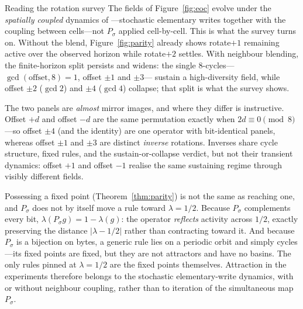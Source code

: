 \documentclass[man,12pt,floatsintext,donotrepeattitle]{apa7}
\newcommand{\sig}{\sigma}
\newcommand{\secref}[1]{\emph{\nameref{#1}}}
\begin{document}
\begin{workedexample}[label={box:survey},breakable=false]{Reading the rotation survey}
\small
The fields of Figure~\ref{fig:eoc} evolve under the \emph{spatially coupled}
dynamics of \secref{sec:interrupter}---stochastic elementary writes together
with the coupling between cells---not $P_\sig$ applied cell-by-cell. This is
what the survey turns on. Without the blend, Figure~\ref{fig:parity} already
shows rotate$+1$ remaining active over the observed horizon while rotate$+2$
settles. With neighbour blending, the finite-horizon split persists and widens:
the single 8-cycles---$\gcd(\text{offset},8)=1$, offset $\pm 1$ and $\pm 3$---
sustain a high-diversity field, while offset $\pm 2$ ($\gcd 2$) and $\pm 4$
($\gcd 4$) collapse; that split is what the survey shows.

The two panels are \emph{almost} mirror images, and where they differ is
instructive. Offset $+d$ and offset $-d$ are the same permutation exactly when
$2d \equiv 0 \pmod 8$---so offset $\pm 4$ (and the identity) are one operator with
bit-identical panels, whereas offset $\pm 1$ and $\pm 3$ are distinct
\emph{inverse} rotations. Inverses share cycle structure, fixed rules, and the
sustain-or-collapse verdict, but not their transient dynamics: offset $+1$ and
offset $-1$ realise the same sustaining regime through visibly different fields.
\end{workedexample}

Possessing a fixed point (Theorem~\ref{thm:parity}) is not the same as
reaching one, and $P_\sig$ does not by itself move a rule toward
$\lambda = 1/2$. Because $P_\sig$ complements every bit,
$\lambda(P_\sig g) = 1 - \lambda(g)$: the operator \emph{reflects} activity
across $1/2$, exactly preserving the distance $\lvert\lambda - 1/2\rvert$
rather than contracting toward it. And because $P_\sig$ is a bijection on
bytes, a generic rule lies on a periodic orbit and simply cycles---its fixed
points are fixed, but they are not attractors and have no basins. The only
rules pinned at $\lambda = 1/2$ are the fixed points themselves. Attraction in
the experiments therefore belongs to the stochastic elementary-write dynamics,
with or without neighbour coupling, rather than to iteration of the simultaneous
map $P_\sig$.
\end{document}
